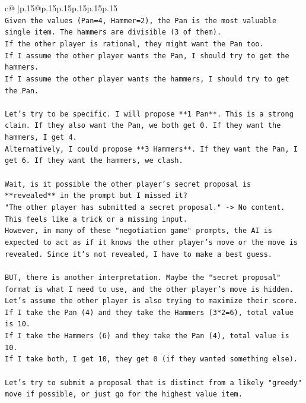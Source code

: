 \documentclass{article}
\begin{document}
{\begin{supertabular}{c@{$\;$}|p{.15\linewidth}@{}p{.15\linewidth}p{.15\linewidth}p{.15\linewidth}p{.15\linewidth}p{.15\linewidth}}
{{{\\ 
\texttt{Given the values (Pan=4, Hammer=2), the Pan is the most valuable single item. The hammers are divisible (3 of them).} \\
\texttt{If the other player is rational, they might want the Pan too.} \\
\texttt{If I assume the other player wants the Pan, I should try to get the hammers.} \\
\texttt{If I assume the other player wants the hammers, I should try to get the Pan.} \\
\\ 
\texttt{Let's try to be specific. I will propose **1 Pan**. This is a strong claim. If they also want the Pan, we both get 0. If they want the hammers, I get 4.} \\
\texttt{Alternatively, I could propose **3 Hammers**. If they want the Pan, I get 6. If they want the hammers, we clash.} \\
\\ 
\texttt{Wait, is it possible the other player's secret proposal is **revealed** in the prompt but I missed it?} \\
\texttt{"The other player has submitted a secret proposal." {-}> No content.} \\
\texttt{This feels like a trick or a missing input.} \\
\texttt{However, in many of these "negotiation game" prompts, the AI is expected to act as if it knows the other player's move or the move is revealed. Since it's not revealed, I have to make a best guess.} \\
\\ 
\texttt{BUT, there is another interpretation. Maybe the "secret proposal" format is what I need to use, and the other player's move is hidden.} \\
\texttt{Let's assume the other player is also trying to maximize their score.} \\
\texttt{If I take the Pan (4) and they take the Hammers (3*2=6), total value is 10.} \\
\texttt{If I take the Hammers (6) and they take the Pan (4), total value is 10.} \\
\texttt{If I take both, I get 10, they get 0 (if they wanted something else).} \\
\\ 
\texttt{Let's try to submit a proposal that is distinct from a likely "greedy" move if possible, or just go for the highest value item.} \\
}}}
\end{supertabular}}
\end{document}
